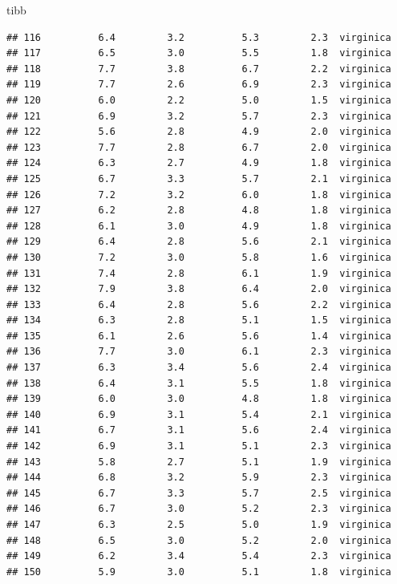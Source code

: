 \documentclass[ignorenonframetext,]{beamer}
\begin{document}
\begin{frame}[fragile]{tibb}
\begin{verbatim}
## 116          6.4         3.2          5.3         2.3  virginica
## 117          6.5         3.0          5.5         1.8  virginica
## 118          7.7         3.8          6.7         2.2  virginica
## 119          7.7         2.6          6.9         2.3  virginica
## 120          6.0         2.2          5.0         1.5  virginica
## 121          6.9         3.2          5.7         2.3  virginica
## 122          5.6         2.8          4.9         2.0  virginica
## 123          7.7         2.8          6.7         2.0  virginica
## 124          6.3         2.7          4.9         1.8  virginica
## 125          6.7         3.3          5.7         2.1  virginica
## 126          7.2         3.2          6.0         1.8  virginica
## 127          6.2         2.8          4.8         1.8  virginica
## 128          6.1         3.0          4.9         1.8  virginica
## 129          6.4         2.8          5.6         2.1  virginica
## 130          7.2         3.0          5.8         1.6  virginica
## 131          7.4         2.8          6.1         1.9  virginica
## 132          7.9         3.8          6.4         2.0  virginica
## 133          6.4         2.8          5.6         2.2  virginica
## 134          6.3         2.8          5.1         1.5  virginica
## 135          6.1         2.6          5.6         1.4  virginica
## 136          7.7         3.0          6.1         2.3  virginica
## 137          6.3         3.4          5.6         2.4  virginica
## 138          6.4         3.1          5.5         1.8  virginica
## 139          6.0         3.0          4.8         1.8  virginica
## 140          6.9         3.1          5.4         2.1  virginica
## 141          6.7         3.1          5.6         2.4  virginica
## 142          6.9         3.1          5.1         2.3  virginica
## 143          5.8         2.7          5.1         1.9  virginica
## 144          6.8         3.2          5.9         2.3  virginica
## 145          6.7         3.3          5.7         2.5  virginica
## 146          6.7         3.0          5.2         2.3  virginica
## 147          6.3         2.5          5.0         1.9  virginica
## 148          6.5         3.0          5.2         2.0  virginica
## 149          6.2         3.4          5.4         2.3  virginica
## 150          5.9         3.0          5.1         1.8  virginica
\end{verbatim}

\end{frame}
\end{document}
